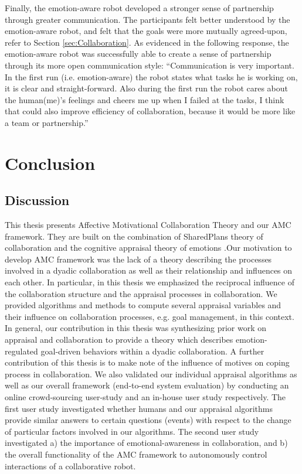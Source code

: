 \documentclass[12pt]{report}
\begin{document}
Finally, the emotion-aware robot developed a stronger sense of  partnership
through greater communication. The participants felt better understood by the
emotion-aware robot, and felt that the goals were more mutually agreed-upon,
refer to Section \ref{sec:Collaboration}. As evidenced in the following
response, the emotion-aware robot was successfully able to create a sense of
partnership through its more open communication style: ``Communication is very
important. In the first run (i.e. emotion-aware) the robot states what tasks he
is working on, it is clear and straight-forward. Also during the first run the
robot cares about the human(me)'s feelings and cheers me up when I failed at the
tasks, I think that could also improve efficiency of collaboration, because it
would be more like a team or partnership.''

\chapter{Conclusion}
\label{ch:conclusion}

\section{Discussion}
This thesis presents Affective Motivational Collaboration Theory and our AMC
framework. They are built on the combination of SharedPlans theory of
collaboration \cite{grosz:plans-discourse} and the cognitive appraisal theory of
emotions \cite{marsella:ema-process-model}
\cite{scherer:appraisal-processes}.Our motivation to develop AMC framework
was the lack of a theory describing the processes involved in a dyadic
collaboration as well as their relationship and influences on each other.
In particular, in this thesis we emphasized the reciprocal influence of the
collaboration structure and the appraisal processes in collaboration. We
provided algorithms and methods to compute several appraisal variables and their
influence on collaboration processes, e.g. goal management, in this context. In
general, our contribution in this thesis was synthesizing prior work on
appraisal and collaboration to provide a theory which describes
emotion-regulated goal-driven behaviors within a dyadic collaboration. A further
contribution of this thesis is to make note of the influence of motives on
coping process in collaboration. We also validated our individual appraisal
algorithms as well as our overall framework (end-to-end system evaluation) by
conducting an online crowd-sourcing user-study and an in-house user study
respectively. The first user study investigated whether humans and our
appraisal algorithms provide similar answers to certain questions (events) with
respect to the change of particular factors involved in our algorithms. The
second user study investigated a) the importance of emotional-awareness in
collaboration, and b) the overall functionality of the AMC framework to
autonomously control interactions of a collaborative robot.
\end{document}
